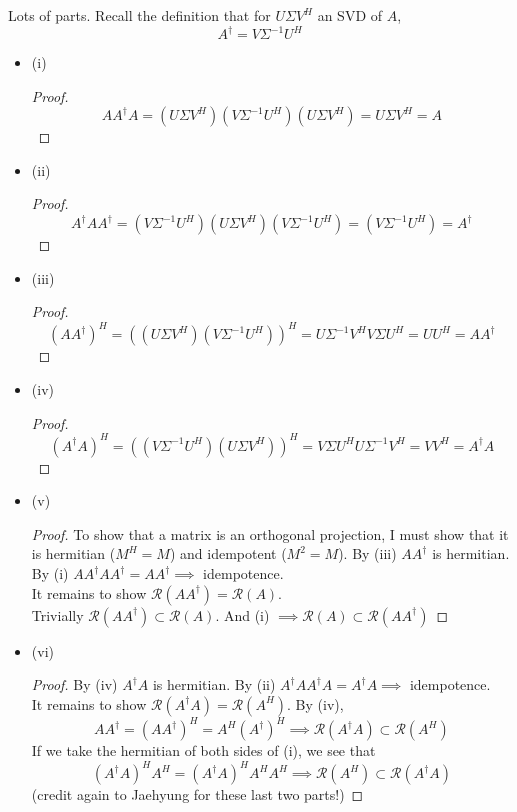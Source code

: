 \documentclass[12pt]{article}
\newenvironment{problem}[2][Problem]{\begin{trivlist}
\item[\hskip \labelsep {\bfseries #1}\hskip \labelsep {\bfseries #2.}]}{\end{trivlist}}
\theoremstyle{definition}
\theoremstyle{definition}
\theoremstyle{definition}
\theoremstyle{definition}
\begin{document}
\begin{problem}{4.38}
Lots of parts. Recall the definition that for $U \Sigma V^H$ an SVD of $A$, $$A^\dagger = V \Sigma^{-1} U^H$$
\begin{itemize}
\item (i) \begin{proof}
$$
AA^\dagger A = (U \Sigma V^H) (V \Sigma^{-1} U^H) (U \Sigma V^H) = U \Sigma V^H = A
$$
\end{proof}
\item (ii) \begin{proof}
$$A^\dagger A A^\dagger = (V \Sigma^{-1} U^H)(U \Sigma V^H) (V \Sigma^{-1} U^H) = (V \Sigma^{-1} U^H) = A^\dagger $$
\end{proof}
\item (iii) \begin{proof}
$$
(AA^\dagger)^H = ((U \Sigma V^H) (V \Sigma^{-1} U^H))^H = U \Sigma^{-1}V^H V \Sigma U^H = UU^H = AA^\dagger
$$
\end{proof}
\item (iv) \begin{proof}
$$
(A^\dagger A)^H = ((V \Sigma^{-1} U^H) (U \Sigma V^H))^H = V \Sigma U^H U \Sigma^{-1} V^H = VV^H = A^\dagger A
$$
\end{proof}
\item (v) \begin{proof}
To show that a matrix is an orthogonal projection, I must show that it is hermitian ($M^H = M$) and idempotent ($M^2 = M$). 
By (iii) $A A^\dagger$ is hermitian. By (i) $AA^\dagger A A^\dagger = A A^\dagger \implies$ idempotence. \\
It remains to show $\mathcal{R}(AA^\dagger) = \mathcal{R} (A)$. \\ 
Trivially $\mathcal{R}(A A^\dagger) \subset \mathcal{R}(A)$. And (i) $\implies \mathcal{R}(A) \subset \mathcal{R}(A A^\dagger)$ 
\end{proof}
\item (vi) \begin{proof}
By (iv) $A^\dagger A$ is hermitian. By (ii) $A^\dagger A A^\dagger A = A^\dagger A \implies$ idempotence. \\
It remains to show $\mathcal{R}(A^\dagger A) = \mathcal{R} (A^H)$. By (iv), 
$$AA^\dagger = (AA^\dagger)^H = A^H (A^\dagger)^H \implies \mathcal{R}(A^\dagger A) \subset \mathcal{R} (A^H) $$
If we take the hermitian of both sides of (i), we see that 
$$ (A^\dagger A)^H A^H = (A^\dagger A)^H A^H A^H \implies \mathcal{R} (A^H) \subset \mathcal{R}(A^\dagger A) $$
(credit again to Jaehyung for these last two parts!)
\end{proof}
\end{itemize}
\end{problem}
\end{document}
